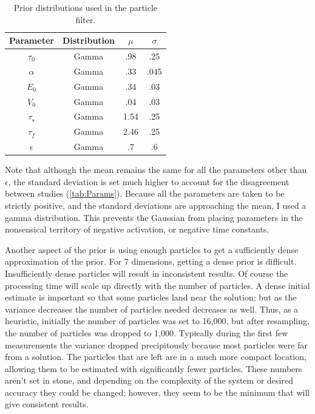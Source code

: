 \begin{table}[t]
\centering
\begin{tabular}{|c || c | c | c |}
\hline 
Parameter & Distribution & $\mu$ & $\sigma$ \\
\hline
$\tau_0$ & Gamma & .98 & .25 \\
$\alpha$ & Gamma & .33 & .045\\
$E_0$    & Gamma & .34 & .03  \\
$V_0$    & Gamma & .04 & .03 \\
$\tau_s$ & Gamma & 1.54  & .25\\
$\tau_f$ & Gamma & 2.46  & .25\\
$\epsilon$ & Gamma & .7  & .6 \\
\hline
\end{tabular}
\caption{Prior distributions used in the particle filter.}
\label{tab:Prior} 
\end{table}

Note that although the mean remains the same for all the 
parameters other than $\epsilon$, the standard deviation is set
much higher to account for the disagreement between studies
(\autoref{tab:Params}). 
Because all the parameters are taken to be strictly positive, and the
standard deviations are approaching the mean, I used a gamma distribution.
This prevents the Gaussian from placing parameters in the nonsensical 
territory of negative activation, or negative time constants.

Another aspect of the prior is using enough particles to get a 
sufficiently dense approximation of the prior. For 7 dimensions,
getting a dense prior is difficult. Insufficiently
dense particles will result in inconsistent results. Of course the
processing time will scale up directly with the number of particles.
A dense initial estimate is important so that some particles land
near the solution; but as the variance decreases the number of 
particles needed decreases as well. Thus, as a heuristic, initially
the number of particles was set to 16,000, but after resampling,
the number of particles was dropped to 1,000. Typically during the 
first few measurements the variance dropped precipitously because
most particles were far from a solution.  The particles that are left are in a
much more compact location, allowing them to be estimated with 
significantly fewer particles. These numbers aren't set in stone,
and depending on the complexity of the system or desired accuracy
they could be changed; however, they seem to be the minimum that
will give consistent results.

